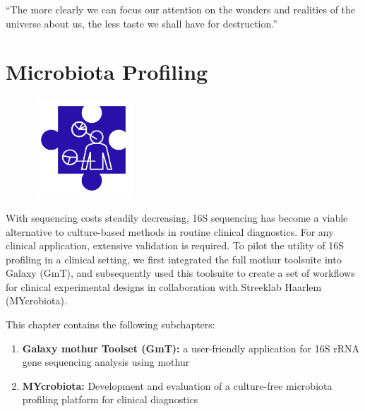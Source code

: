 \begin{savequote}[75mm]
“The more clearly we can focus our attention on the wonders and realities of the universe about us, the less taste we shall have for destruction.”
\end{savequote}

\chapter{Microbiota Profiling}\label{chapter:microbiota}
\setcounter{figure}{-1}
\setcounter{table}{-1}
\setcounter{section}{-1}

\begin{figure}[t!]
\includegraphics[height=10em]{frontmatter/images/chapter-header-microbiota.png}
\end{figure}
\setcounter{figure}{-1}
\setcounter{table}{-1}
\setcounter{section}{-1}

With sequencing costs steadily decreasing, 16S sequencing has become a viable alternative to culture-based methods in routine clinical diagnostics. For any clinical application, extensive validation is required. To pilot the utility of 16S profiling in a clinical setting, we first integrated the full mothur toolsuite into Galaxy (GmT), and subsequently used this toolsuite to create a set of workflows for clinical experimental designs in collaboration with Streeklab Haarlem (MYcrobiota).

This chapter contains the following subchapters:

\begin{enumerate}
\itemsep-0.5em
\item \textbf{Galaxy mothur Toolset (GmT):} a user-friendly application for 16S rRNA gene sequencing analysis using mothur
\item \textbf{MYcrobiota:} Development and evaluation of a culture-free microbiota profiling platform for clinical diagnostics
\end{enumerate}


